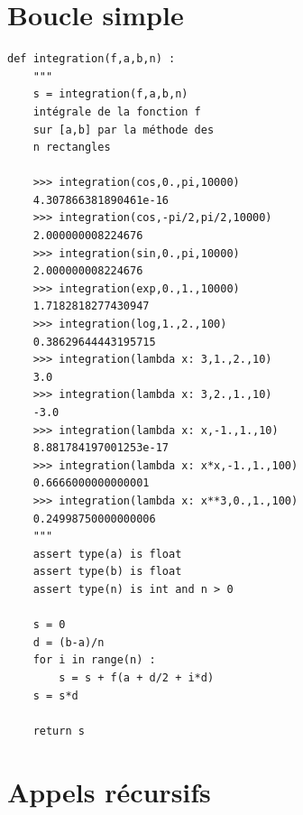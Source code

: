 \documentclass[11pt,a4paper]{article}
\begin{document}

\section{Boucle simple}

{\footnotesize
\begin{lstlisting}
def integration(f,a,b,n) :
    """
    s = integration(f,a,b,n)
    intégrale de la fonction f
    sur [a,b] par la méthode des
    n rectangles
    
    >>> integration(cos,0.,pi,10000)
    4.307866381890461e-16
    >>> integration(cos,-pi/2,pi/2,10000)
    2.000000008224676
    >>> integration(sin,0.,pi,10000)
    2.000000008224676
    >>> integration(exp,0.,1.,10000)
    1.7182818277430947
    >>> integration(log,1.,2.,100)
    0.38629644443195715
    >>> integration(lambda x: 3,1.,2.,10)
    3.0
    >>> integration(lambda x: 3,2.,1.,10)
    -3.0
    >>> integration(lambda x: x,-1.,1.,10)
    8.881784197001253e-17
    >>> integration(lambda x: x*x,-1.,1.,100)
    0.6666000000000001
    >>> integration(lambda x: x**3,0.,1.,100)
    0.24998750000000006
    """
    assert type(a) is float
    assert type(b) is float
    assert type(n) is int and n > 0
    
    s = 0
    d = (b-a)/n
    for i in range(n) :
        s = s + f(a + d/2 + i*d)
    s = s*d
    
    return s
\end{lstlisting}
}
\section{Appels récursifs}
\end{document}
